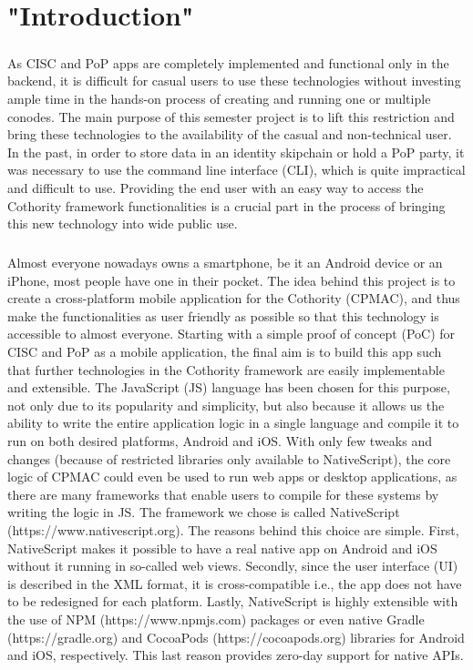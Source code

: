 \chapter{"Introduction"}

\paragraph{}
As CISC and PoP apps are completely implemented and functional only in the backend, it is difficult for casual users to use these technologies without investing ample time in the hands-on process of creating and running one or multiple conodes. The main purpose of this semester project is to lift this restriction and bring these technologies to the availability of the casual and non-technical user. In the past, in order to store data in an identity skipchain or hold a PoP party, it was necessary to use the command line interface (CLI), which is quite impractical and difficult to use. Providing the end user with an easy way to access the Cothority framework functionalities is a crucial part in the process of bringing this new technology into wide public use.

\paragraph{}
Almost everyone nowadays owns a smartphone, be it an Android device or an iPhone, most people have one in their pocket. The idea behind this project is to create a cross-platform mobile application for the Cothority (CPMAC), and thus make the functionalities as user friendly as possible so that this technology is accessible to almost everyone.
Starting with a simple proof of concept (PoC) for CISC and PoP as a mobile application, the final aim is to build this app such that further technologies in the Cothority framework are easily implementable and extensible. The JavaScript (JS) language has been chosen for this purpose, not only due to its popularity and simplicity, but also because it allows us the ability to write the entire application logic in a single language and compile it to run on both desired platforms, Android and iOS. With only few tweaks and changes (because of restricted libraries only available to NativeScript), the core logic of CPMAC could even be used to run web apps or desktop applications, as there are many frameworks that enable users to compile for these systems by writing the logic in JS. The framework we chose is called NativeScript (https://www.nativescript.org). The reasons behind this choice are simple. First, NativeScript makes it possible to have a real native app on Android and iOS without it running in so-called web views. Secondly, since the user interface (UI) is described in the XML format, it is cross-compatible i.e., the app does not have to be redesigned for each platform. Lastly, NativeScript is highly extensible with the use of NPM (https://www.npmjs.com) packages or even native Gradle (https://gradle.org) and CocoaPods (https://cocoapods.org) libraries for Android and iOS, respectively. This last reason provides zero-day support for native APIs.
